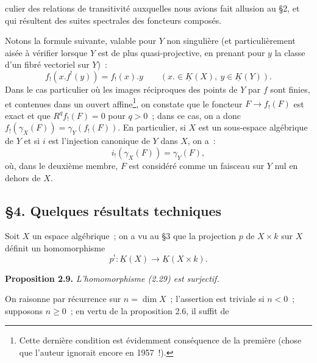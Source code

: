 culier des relations de transitivité auxquelles nous avions fait allusion au \S 2, et qui résultent des suites spectrales des foncteurs composés.

Notons la formule suivante, valable pour $Y$ non singulière (et particulièrement aisée à vérifier lorsque $Y$ est de plus quasi-projective, en prenant pour $y$ la classe d'un fibré vectoriel sur $Y$)~:
\begin{equation}\tag{2.27}
 f_!(x.f^!(y))=f_!(x).y\qquad(x.\in\underline K(X),\ y\in\underline K(Y)).
\end{equation}
Dans le cas particulier où les images réciproques des points de $Y$ par $f$ sont finies, et contenues dans un ouvert affine\footnote{Cette dernière condition est évidemment conséquence de la première (chose que l'auteur ignorait encore en 1957~!).}, on constate que le foncteur $F\longrightarrow f_!(F)$ est exact et que $R^qf_!(F)=0$ pour $q>0$~; dans ce cas, on a donc $f_!(\gamma_X(F))=\gamma_Y(f_!(F))$. En particulier, si $X$ est un sous-espace algébrique de $Y$ et si $i$ est l'injection canonique de $Y$ dans $X$, on a~:
\begin{equation}\tag{2.28}
 i_!(\gamma_X(F))=\gamma_Y(F),
\end{equation}
où, dans le deuxième membre, $F$ est considéré comme un faisceau sur $Y$ nul en dehors de $X$.

\subsection*{\S 4. Quelques résultats techniques}

Soit $X$ un espace algébrique~; on a vu au \S 3 que la projection $p$ de $X\times k$ sur $X$ définit un homomorphisme
\begin{equation}\tag{2.29}
 p^!:\underline K(X)\longrightarrow\underline K(X\times k).
\end{equation}

\textbf{Proposition 2.9.} \emph{L'homomorphisme (2.29) est surjectif.}

On raisonne par récurrence sur $n=\dim X$~; l'assertion est triviale si $n<0$~; supposons $n\geq0$~; en vertu de la proposition 2.6, il suffit de
